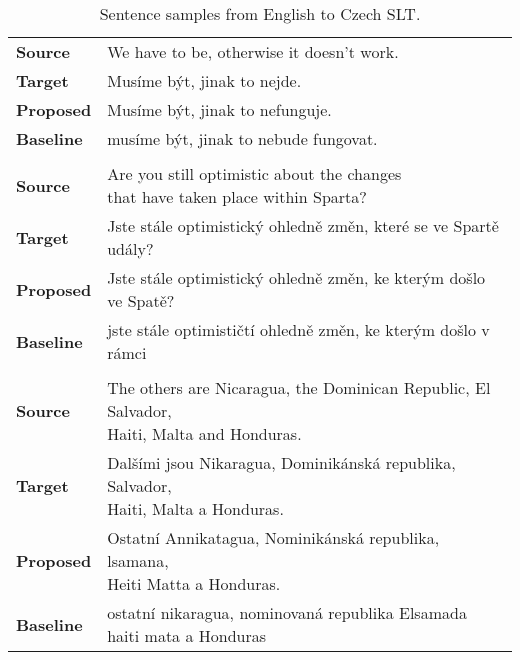 \begin{table}[]
	\centering
	\begin{tabular}{ll}
		\multicolumn{1}{l|}{\textbf{Source}}   & We have to be, otherwise it doesn't work.      \\
		\multicolumn{1}{l|}{\textbf{Target}}   & Musíme být, jinak to nejde. \\
		\multicolumn{1}{l|}{\textbf{Proposed}} & Musíme být, jinak to nefunguje.      \\
		\multicolumn{1}{l|}{\textbf{Baseline}} & musíme být, jinak to nebude fungovat.    \\
		\textbf{}                              &                                                           \\
		\multicolumn{1}{l|}{\textbf{Source}}   & \makecell[l]{ Are you still optimistic about the changes\\ that have taken place within Sparta? }    \\
		\multicolumn{1}{l|}{\textbf{Target}}   & Jste stále optimistický ohledně změn, které se ve Spartě udály?      \\
		\multicolumn{1}{l|}{\textbf{Proposed}} & Jste stále optimistický ohledně změn, ke kterým došlo ve Spatě?                 \\
		\multicolumn{1}{l|}{\textbf{Baseline}} & jste stále optimističtí ohledně změn, ke kterým došlo v rámci      \\
		\textbf{}                              &                                                           \\
		\multicolumn{1}{l|}{\textbf{Source}}   & \makecell[l]{The others are Nicaragua, the Dominican Republic, El Salvador,\\ Haiti, Malta and Honduras. }     \\
		\multicolumn{1}{l|}{\textbf{Target}}   & \makecell[l]{Dalšími jsou Nikaragua, Dominikánská republika, Salvador,\\ Haiti, Malta a Honduras.} \\
		\multicolumn{1}{l|}{\textbf{Proposed}} & \makecell[l]{Ostatní Annikatagua, Nominikánská republika, lsamana,\\ Heiti Matta a Honduras.    }  \\
		\multicolumn{1}{l|}{\textbf{Baseline}} & \makecell[l]{ostatní nikaragua, nominovaná republika Elsamada\\ haiti mata a Honduras   }
	\end{tabular}
	\caption{Sentence samples from English to Czech SLT.}
	\label{tab:en_cs_sample}
\end{table}



